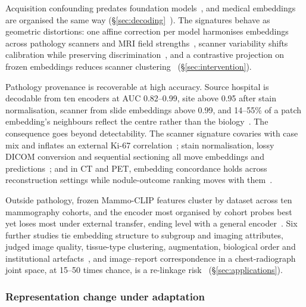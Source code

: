 Acquisition confounding predates foundation models~\cite{zech2018variable}, and medical embeddings are
organised the same way (\S\ref{sec:decoding}~\cite{dejong2025current,komen2024do,zheng2024demographic}).
The signatures behave as geometric distortions: one affine correction per model harmonises embeddings
across pathology scanners and MRI field strengths~\cite{donle2026featmap}, scanner variability shifts
calibration while preserving discrimination~\cite{thiringer2026scanner}, and a contrastive projection on
frozen embeddings reduces scanner clustering~\cite{carloni2025pathology} (\S\ref{sec:intervention}).

Pathology provenance is recoverable at high accuracy. Source hospital is decodable from ten encoders at
AUC 0.82--0.99, site above 0.95 after stain normalisation, scanner from slide embeddings above 0.99, and
14--55\% of a patch embedding's neighbours reflect the centre rather than the
biology~\cite{zhang2025hospital,murchan2024deep,kmen2026robust,jung2026foundation,shafique2026investigating,saueressig2025histology,gustafsson2024evaluating,esbri2025benchmarking}.
The consequence goes beyond detectability. The scanner signature covaries with case mix and inflates an
external Ki-67 correlation~\cite{jung2026foundation}; stain normalisation, lossy DICOM conversion and
sequential sectioning all move embeddings and
predictions~\cite{wolflein2023benchmarking,mayer2025lossy,balan2025reproducibility}; and in CT and PET,
embedding concordance holds across reconstruction settings while nodule-outcome ranking moves with
them~\cite{park2025evaluating,farquhar2026pretraining}.

Outside pathology, frozen Mammo-CLIP features cluster by dataset across ten mammography cohorts, and
the encoder most organised by cohort probes best yet loses most under external transfer, ending level
with a general encoder~\cite{germani2025bias}. Six further studies tie embedding structure to subgroup
and imaging attributes, judged image quality, tissue-type clustering, augmentation, biological order and
institutional
artefacts~\cite{alloula2025representation,ouaari2026assessing,fournier2026prognostic,elphick2024are,vig2026do,zhang2026auditing},
and image--report correspondence in a chest-radiograph joint space, at 15--50 times chance, is a
re-linkage risk~\cite{tayebiarasteh2026crossmodal} (\S\ref{sec:applications}).

\subsubsection{Representation change under adaptation}

